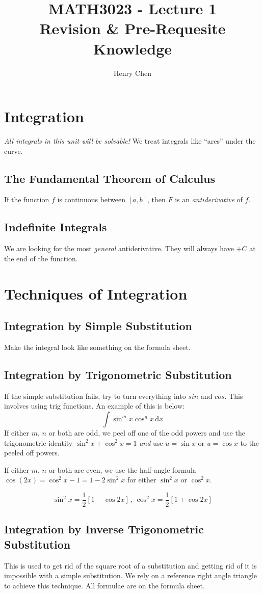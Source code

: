 \documentclass[a4paper, 11pt, twoside]{article}
\title{
    \large \textbf{MATH3023 - Lecture 1} \\
    Revision \& Pre-Requesite Knowledge
}
\author{Henry Chen}
\begin{document}
\maketitle
\tableofcontents

\section{Integration}
\emph{All integrals in this unit will be solvable!}
We treat integrals like ``ares'' under the curve.
\subsection{The Fundamental Theorem of Calculus}
If the function $f$ is continuous between $[a,b]$, then $F$ is an \emph{antiderivative} of $f$.
\subsection{Indefinite Integrals}
We are looking for the most \emph{general} antiderivative. They will always have $+C$ at the end of the function. 

\section{Techniques of Integration}
\subsection{Integration by Simple Substitution}
Make the integral look like something on the formula sheet. 
\subsection{Integration by Trigonometric Substitution}
If the simple substitution fails, try to turn everything into $sin$ and $cos$. This involves using trig functions. An example of this is below:
\[
    \int{\sin^{m}{x}\cos^{n}{x}} \,\mathrm{d}x
\]
If either $m$, $n$ or both are odd, we peel off one of the odd powers and use the trigonometric identity $\sin^{2}{x} + \cos^2{x} = 1$ \emph{and} use $u=\sin{x}$ or $u=\cos{x}$ to the peeled off powers.

If either $m$, $n$ or both are even, we use the half-angle formula $\cos(2x) = \cos^{2}{x} - 1 = 1 - 2\sin^{2}{x} $ for either $\sin^{2}{x}$ or $\cos^{2}{x}$.

\[
    \sin^{2}{x} = \frac{1}{2}[1-\cos{2x}] \, , \, \cos^{2}{x} = \frac{1}{2}[1+\cos{2x}]
\]
\subsection{Integration by Inverse Trigonometric Substitution}
This is used to get rid of the square root of a substitution and getting rid of it is impossible with a simple substitution. We rely on a reference right angle triangle to achieve this technique. All formulae are on the formula sheet.
\end{document}
